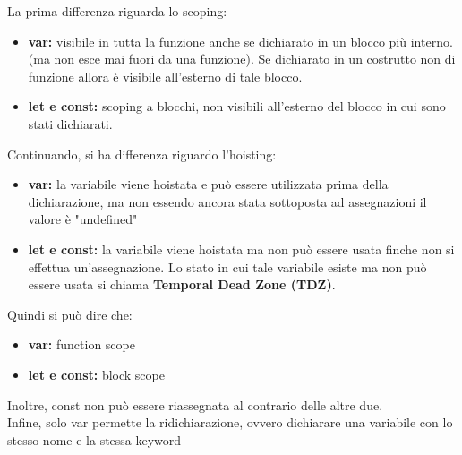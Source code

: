 \documentclass[12pt]{article}
\begin{document}
La prima differenza riguarda lo scoping:
\begin{itemize}
  \item \textbf{var:} visibile in tutta la funzione anche se dichiarato in un blocco più interno. (ma non esce mai fuori da una funzione). Se dichiarato in un costrutto non di funzione allora è visibile all'esterno di tale blocco.
  \item \textbf{let e const:} scoping a blocchi, non visibili all'esterno del blocco in cui sono stati dichiarati.
\end{itemize}
Continuando, si ha differenza riguardo l'hoisting:
\begin{itemize}
  \item \textbf{var:} la variabile viene hoistata e può essere utilizzata prima della dichiarazione, ma non essendo ancora stata sottoposta ad assegnazioni il valore è "undefined"
  \item \textbf{let e const:} la variabile viene hoistata ma non può essere usata finche non si effettua un'assegnazione. Lo stato in cui tale variabile esiste ma non può essere usata si chiama \textbf{Temporal Dead Zone (TDZ)}.
\end{itemize}
Quindi si può dire che:
\begin{itemize}
  \item \textbf{var:} function scope
  \item \textbf{let e const:} block scope
\end{itemize}
Inoltre, const non può essere riassegnata al contrario delle altre due.\\
Infine, solo var permette la ridichiarazione, ovvero dichiarare una variabile con lo stesso nome e la stessa keyword\\
\end{document}

